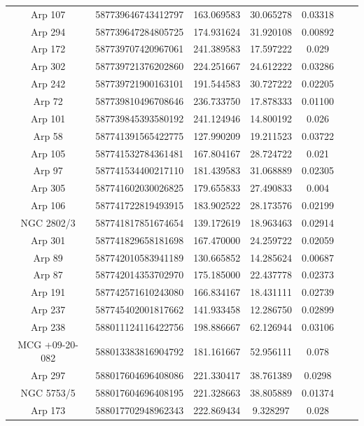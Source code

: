 \begin{table}
\begin{tabular}{|c|c|c|c|c|c|c|}
         Arp 107 & 587739646743412797 & 163.069583 & 30.065278 & 0.03318 \\
         Arp 294 & 587739647284805725 & 174.931624 & 31.920108 & 0.00892 \\
         Arp 172 & 587739707420967061 & 241.389583 & 17.597222 & 0.029 \\
         Arp 302 & 587739721376202860 & 224.251667 & 24.612222 & 0.03286 \\
         Arp 242 & 587739721900163101 & 191.544583 & 30.727222 & 0.02205 \\
         Arp 72 & 587739810496708646 & 236.733750 & 17.878333 & 0.01100 \\
         Arp 101 & 587739845393580192 & 241.124946 & 14.800192 & 0.026 \\
         Arp 58 & 587741391565422775 & 127.990209 & 19.211523 & 0.03722 \\
         Arp 105 & 587741532784361481 & 167.804167 & 28.724722 & 0.021 \\
         Arp 97 & 587741534400217110 & 181.439583 & 31.068889 & 0.02305 \\
         Arp 305 & 587741602030026825 & 179.655833 & 27.490833 & 0.004 \\
         Arp 106 & 587741722819493915 & 183.902522 & 28.173576 & 0.02199 \\
         NGC 2802/3 & 587741817851674654 & 139.172619 & 18.963463 & 0.02914 \\
         Arp 301 & 587741829658181698 & 167.470000 & 24.259722 & 0.02059 \\
         Arp 89 & 587742010583941189 & 130.665852 & 14.285624 & 0.00687 \\
         Arp 87 & 587742014353702970 & 175.185000 & 22.437778 & 0.02373 \\
         Arp 191 & 587742571610243080 & 166.834167 & 18.431111 & 0.02739 \\
         Arp 237 & 587745402001817662 & 141.933458 & 12.286750 & 0.02899 \\
         Arp 238 & 588011124116422756 & 198.886667 & 62.126944 & 0.03106 \\
         MCG +09-20-082 & 588013383816904792 & 181.161667 & 52.956111 & 0.078 \\
         Arp 297 & 588017604696408086 & 221.330417 & 38.761389 & 0.0298 \\
         NGC 5753/5 & 588017604696408195 & 221.328663 & 38.805889 & 0.01374 \\
         Arp 173 & 588017702948962343 & 222.869434 & 9.328297 & 0.028 \\

\end{tabular}
\end{table}
